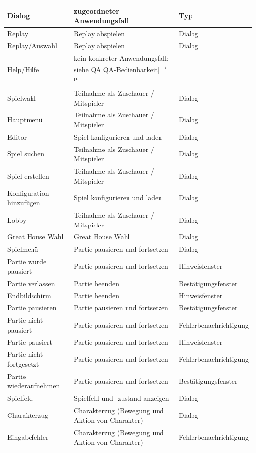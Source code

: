 \documentclass[12pt]{article}
\newcounter{fa}
\newcounter{nfa}
\newcommand{\nfaref}[1]{QA\ref{#1}\textsuperscript{$\rightarrow$ p. \pageref{#1}}}
\begin{document}
\begin{tabularx}{16cm}{p{4cm}|p{7cm}|l}
	\textbf{Dialog} & \textbf{zugeordneter Anwendungsfall} & Typ \\
	\hline
	Replay & Replay abspielen & Dialog \\
	Replay/Auswahl & Replay abspielen & Dialog \\
	Help/Hilfe & kein konkreter Anwendungsfall; siehe \nfaref{QA-Bedienbarkeit} \\			Spielwahl & Teilnahme als Zuschauer / Mitspieler & Dialog \\
	Hauptmenü & Teilnahme als Zuschauer / Mitspieler & Dialog \\
	Editor & Spiel konfigurieren und laden & Dialog \\
	Spiel suchen & Teilnahme als Zuschauer / Mitspieler & Dialog \\
	Spiel erstellen & Teilnahme als Zuschauer / Mitspieler & Dialog \\
	Konfiguration hinzufügen & Spiel konfigurieren und laden & Dialog \\
	Lobby & Teilnahme als Zuschauer / Mitspieler & Dialog \\
	Great House Wahl & Great House Wahl & Dialog \\
	Spielmenü & Partie pausieren und fortsetzen & Dialog \\
	Partie wurde pausiert & Partie pausieren und fortsetzen & Hinweisfenster \\
	Partie verlassen & Partie beenden & Bestätigungsfenster \\
	Endbildschirm & Partie beenden & Hinweisfenster \\ 	
	Partie pausieren & Partie pausieren und fortsetzen & Bestätigungsfenster \\
	Partie nicht pausiert & Partie pausieren und fortsetzen & Fehlerbenachrichtigung \\		
	Partie pausiert & Partie pausieren und fortsetzen & Hinweisfenster \\	
	Partie nicht fortgesetzt & Partie pausieren und fortsetzen & Fehlerbenachrichtigung \\ 
	Partie wiederaufnehmen & Partie pausieren und fortsetzen & Bestätigungsfenster \\
	Spielfeld & Spielfeld und -zustand anzeigen & Dialog \\
	Charakterzug & Charakterzug (Bewegung und Aktion von Charakter) & Dialog \\ 
	Eingabefehler & Charakterzug (Bewegung und Aktion von Charakter) & Fehlerbenachrichtigung \\

\end{tabularx}
\end{document}
